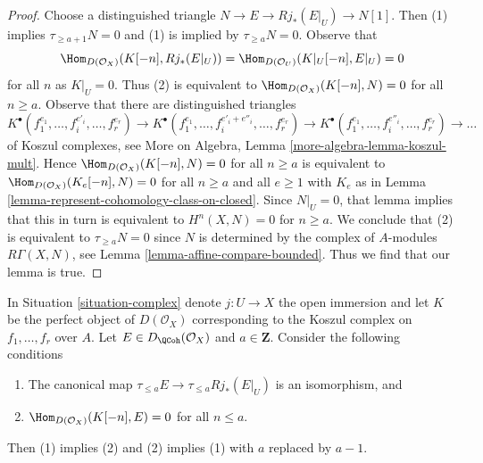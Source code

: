 \begin{proof}
Choose a distinguished triangle $N \to E \to Rj_*(E|_U) \to N[1]$.
Then (1) implies $\tau_{\geq a + 1} N = 0$ and (1) is implied by
$\tau_{\geq a}N = 0$. Observe that
$$
\Hom_{D(\mathcal{O}_X)}(K[-n], Rj_*(E|_U)) =
\Hom_{D(\mathcal{O}_U)}(K|_U[-n], E|_U) = 0
$$
for all $n$ as $K|_U = 0$. Thus (2) is equivalent to
$\Hom_{D(\mathcal{O}_X)}(K[-n], N) = 0$ for all $n \geq a$. 
Observe that there are distinguished triangles
$$
K^\bullet(f_1^{e_1}, \ldots, f_i^{e'_i}, \ldots, f_r^{e_r}) \to
K^\bullet(f_1^{e_1}, \ldots, f_i^{e'_i + e''_i}, \ldots, f_r^{e_r}) \to
K^\bullet(f_1^{e_1}, \ldots, f_i^{e''_i}, \ldots, f_r^{e_r}) \to \ldots
$$
of Koszul complexes, see
More on Algebra, Lemma \ref{more-algebra-lemma-koszul-mult}. Hence
$\Hom_{D(\mathcal{O}_X)}(K[-n], N) = 0$ for all $n \geq a$
is equivalent to
$\Hom_{D(\mathcal{O}_X)}(K_e[-n], N) = 0$ for all $n \geq a$ and
all $e \geq 1$ with $K_e$ as in
Lemma \ref{lemma-represent-cohomology-class-on-closed}.
Since $N|_U = 0$, that lemma implies that this in turn is equivalent to
$H^n(X, N) = 0$ for $n \geq a$. We conclude that (2) is equivalent
to $\tau_{\geq a}N = 0$ since $N$ is determined by the complex of
$A$-modules $R\Gamma(X, N)$, see Lemma \ref{lemma-affine-compare-bounded}.
Thus we find that our lemma is true.
\end{proof}

\begin{lemma}
\label{lemma-orthogonal-koszul-second-variant}
In Situation \ref{situation-complex} denote $j : U \to X$ the open
immersion and let $K$ be the perfect object of $D(\mathcal{O}_X)$
corresponding to the Koszul complex on $f_1, \ldots, f_r$ over $A$.
Let $E \in D_\QCoh(\mathcal{O}_X)$ and $a \in \mathbf{Z}$. Consider
the following conditions
\begin{enumerate}
\item The canonical map $\tau_{\leq a}E \to \tau_{\leq a} Rj_*(E|_U)$
is an isomorphism, and
\item $\Hom_{D(\mathcal{O}_X)}(K[-n], E) = 0$ for all $n \leq a$.
\end{enumerate}
Then (1) implies (2) and (2) implies (1) with $a$ replaced by $a - 1$.
\end{lemma}

